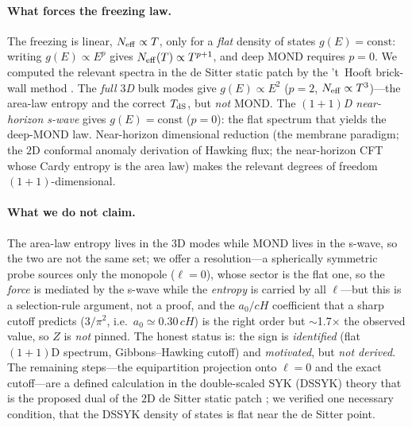 \documentclass[11pt]{article}
\newcommand{\az}{a_0}
\begin{document}
\paragraph{What forces the freezing law.} The freezing is linear, $N_{\rm eff}\propto T$, only for a
\emph{flat} density of states $g(E)=\mathrm{const}$: writing $g(E)\propto E^p$ gives
$N_{\rm eff}(T)\propto T^{p+1}$, and deep MOND requires $p=0$. We computed the relevant spectra in the
de Sitter static patch by the 't~Hooft brick-wall method \cite{thooft1985}. The \emph{full $3$D} bulk
modes give $g(E)\propto E^2$ ($p=2$, $N_{\rm eff}\propto T^3$)---the area-law entropy and the correct
$T_{\rm dS}$, but \emph{not} MOND. The \emph{$(1{+}1)$D near-horizon s-wave} gives $g(E)=\mathrm{const}$
($p=0$): the flat spectrum that yields the deep-MOND law. Near-horizon dimensional reduction (the
membrane paradigm; the $2$D conformal anomaly derivation of Hawking flux; the near-horizon CFT whose
Cardy entropy is the area law) makes the relevant degrees of freedom $(1{+}1)$-dimensional.

\paragraph{What we do not claim.} The area-law entropy lives in the $3$D modes while MOND lives in the
s-wave, so the two are not the same set; we offer a resolution---a spherically symmetric probe sources
only the monopole ($\ell=0$), whose sector is the flat one, so the \emph{force} is mediated by the
s-wave while the \emph{entropy} is carried by all $\ell$---but this is a selection-rule argument, not a
proof, and the $\az/cH$ coefficient that a sharp cutoff predicts ($3/\pi^2$, i.e.\ $\az\simeq0.30\,cH$)
is the right order but $\sim$1.7$\times$ the observed value, so $Z$ is \emph{not} pinned. The honest
status is: the sign is \emph{identified} (flat $(1{+}1)$D spectrum, Gibbons--Hawking cutoff) and
\emph{motivated}, but \emph{not derived}. The remaining steps---the equipartition projection onto
$\ell=0$ and the exact cutoff---are a defined calculation in the double-scaled SYK (DSSYK) theory that
is the proposed dual of the $2$D de Sitter static patch \cite{narovlansky2023}; we verified one
necessary condition, that the DSSYK density of states is flat near the de Sitter point.
\end{document}
